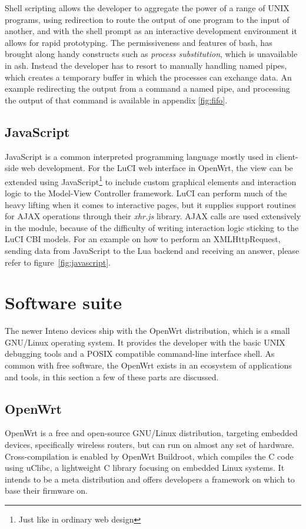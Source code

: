 \documentclass[a4paper,11pt,makeidx]{kth-bcs}
\begin{document}
Shell scripting allows the developer to aggregate the power of a range of UNIX programs, using redirection to route the output of one program to the input of another, and with the shell prompt as an interactive development environment it allows for rapid prototyping.
The permissiveness and features of bash, has brought along handy constructs such as \emph{process substitution}, which is unavailable in ash.
Instead the developer has to resort to manually handling named pipes, which creates a temporary buffer in which the processes can exchange data.
An example redirecting the output from a command a named pipe, and processing the output of that command is available in appendix \ref{fig:fifo}.

\subsection{JavaScript} \label{javascript}
JavaScript is a common interpreted programming language mostly used in client-side web development.
For the LuCI web interface in OpenWrt, the view can be extended using JavaScript\footnote{Just like in ordinary web design} to include custom graphical elements and interaction logic to the Model-View Controller framework.
LuCI can perform much of the heavy lifting when it comes to interactive pages, but it supplies support routines for AJAX operations through their \emph{xhr.js} library.
AJAX calls are used extensively in the module, because of the difficulty of writing interaction logic sticking to the LuCI CBI models.
For an example on how to perform an XMLHttpRequest, sending data from JavaScript to the Lua backend and receiving an answer, please refer to figure~\ref{fig:javascript}.

\section{Software suite}

The newer Inteno devices ship with the OpenWrt distribution, which is a small GNU/Linux operating system.
It provides the developer with the basic UNIX debugging tools and a POSIX compatible command-line interface shell.
As common with free software, the OpenWrt exists in an ecosystem of applications and tools, in this section a few of these parts are discussed.

\subsection{OpenWrt}
OpenWrt is a free and open-source GNU/Linux distribution, targeting embedded devices, specifically wireless routers, but can run on almost any set of hardware.
Cross-compilation is enabled by OpenWrt Buildroot, which compiles the C code using uClibc, a lightweight C library focusing on embedded Linux systems. 
It intends to be a meta distribution and offers developers a framework on which to base their firmware on.
\end{document}
